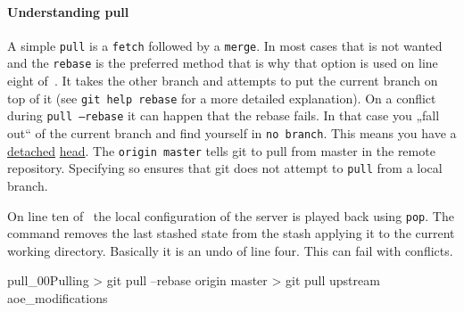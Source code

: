 \paragraph{Understanding pull}
A simple \texttt{pull} is a \texttt{fetch} followed by a \texttt{merge}. In most cases that is not wanted and the \texttt{rebase} is the preferred method that is why that option is used on line eight of~. It takes the other branch and attempts to put the current branch on top of it (see \texttt{git help rebase} for a more detailed explanation). On a conflict during \texttt{pull --rebase} it can happen that the rebase fails. In that case you „fall out“ of the current branch and find yourself in \texttt{no branch}. This means you have a \href{http://www.kernel.org/pub/software/scm/git/docs/git-checkout.html#_detached_head}{detached} \href{http://sitaramc.github.com/concepts/detached-head.html}{head}. The \texttt{origin master} tells git to pull from master in the remote repository. Specifying so ensures that git does not attempt to \texttt{pull} from a local branch.

On line ten of~ the local configuration of the server is played back using \texttt{pop}. The command removes the last stashed state from the stash applying it to the current working directory. Basically it is an undo of line four. This can fail with conflicts.
\begin{codelisting}{pull_00}{Pulling}
> git pull --rebase origin master
> git pull upstream aoe_modifications
\end{codelisting}
